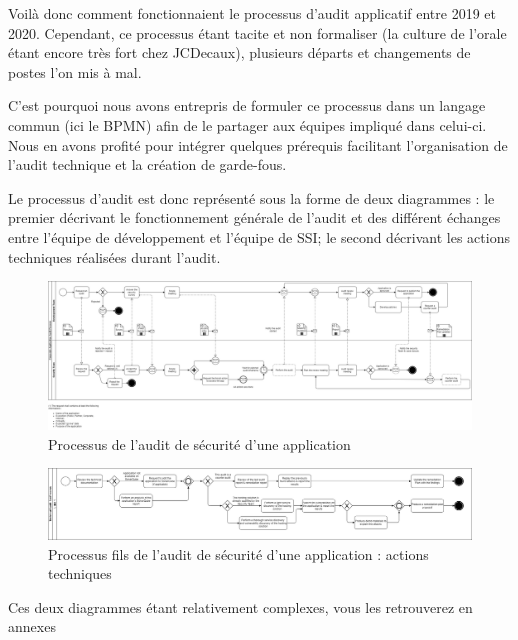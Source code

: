 Voilà donc comment fonctionnaient le processus d'audit applicatif entre 2019 et 2020. 
\newline Cependant, ce processus étant tacite et non formaliser (la culture de l'orale étant encore très fort chez 
JCDecaux), plusieurs départs et changements de postes l'on mis à mal.

C'est pourquoi nous avons entrepris de formuler ce processus dans un langage commun (ici le \ac{BPMN}) afin de le partager
aux équipes impliqué dans celui-ci. Nous en avons profité pour intégrer quelques prérequis facilitant l'organisation 
de l'audit technique et la création de garde-fous.

\newpage

Le processus d'audit est donc représenté sous la forme de deux diagrammes : le premier décrivant le fonctionnement 
générale de l'audit et des différent échanges entre l'équipe de développement et l'équipe de \ac{SSI}; le second 
décrivant les actions techniques réalisées durant l'audit.

\begin{figure}[h]
    \centering
    \includegraphics[width=\linewidth]{resources/img/process_audit.png}
    \caption{Processus de l'audit de sécurité d'une application}
\end{figure}

\begin{figure}[h]
    \centering
    \includegraphics[width=\linewidth]{resources/img/technical_audit_subprocess.png}
    \caption{Processus fils de l'audit de sécurité d'une application : actions techniques}
\end{figure}
\begin{center}
    \colorbox{gray!15}{Ces deux diagrammes étant relativement complexes, vous les retrouverez en annexes}
\end{center}

